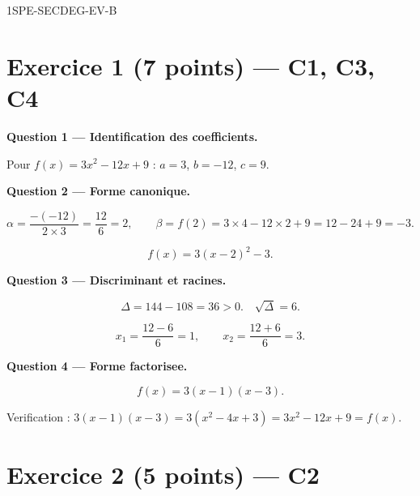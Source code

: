 \begin{corrige}{1SPE-SECDEG-EV-B}

\section*{Exercice 1 \hfill (7 points) — C1, C3, C4}


\bigskip
\textbf{Question 1 — Identification des coefficients.}


Pour $f(x) = 3x^2 - 12x + 9$ : $a = 3$, $b = -12$, $c = 9$.

\medskip
\textbf{Question 2 — Forme canonique.}


\[
\alpha = \frac{-(-12)}{2 \times 3} = \frac{12}{6} = 2, \qquad
\beta = f(2) = 3 \times 4 - 12 \times 2 + 9 = 12 - 24 + 9 = -3.
\]

\[
\boxed{f(x) = 3(x-2)^2 - 3.}
\]

\medskip
\textbf{Question 3 — Discriminant et racines.}


\[
\Delta = 144 - 108 = 36 > 0. \quad \sqrt{\Delta} = 6.
\]

\[
x_1 = \frac{12 - 6}{6} = 1, \qquad x_2 = \frac{12 + 6}{6} = 3.
\]

\medskip
\textbf{Question 4 — Forme factorisee.}


\[
\boxed{f(x) = 3(x-1)(x-3).}
\]

Verification : $3(x-1)(x-3) = 3(x^2 - 4x + 3) = 3x^2 - 12x + 9 = f(x)$. \checkmark

\section*{Exercice 2 \hfill (5 points) — C2}


\end{corrige}
